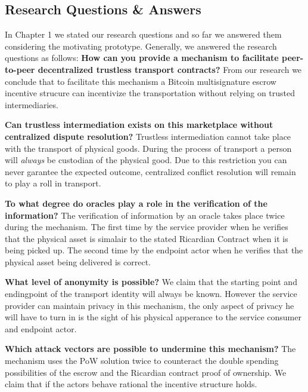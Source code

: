\subsection{Research Questions \& Answers}

In Chapter 1 we stated our research questions and so far we answered them considering the motivating prototype. Generally, we answered the research questions as follows:
\bigbreak
\noindent \textbf{How can you provide a mechanism to facilitate peer-to-peer decentralized trustless transport contracts?} From our research we conclude that to facilitate this mechanism a Bitcoin multisignature escrow incentive strucure can incentivize the transportation without relying on trusted intermediaries.

\bigbreak
\noindent \textbf{Can trustless intermediation exists on this marketplace without centralized dispute resolution?} Trustless intermediation cannot take place with the transport of physical goods. During the process of transport a person will \textit{always} be custodian of the physical good. Due to this restriction you can never garantee the expected outcome, centralized conflict resolution will remain to play a roll in transport.


\bigbreak
\noindent \textbf{To what degree do oracles play a role in the verification of the information?} The verification of information by an oracle takes place twice during the mechanism. The first time by the service provider when he verifies that the physical asset is simalair to the stated Ricardian Contract when it is being picked up. The second time by the endpoint actor when he verifies that the physical asset being delivered is correct.

\bigbreak
\noindent \textbf{What level of anonymity is possible?} We claim that the starting point and endingpoint of the transport identity will always be known. However the service provider can maintain privacy in this mechanism, the only aspect of privacy he will have to turn in is the sight of his physical apperance to the service consumer and endpoint actor.

\bigbreak
\noindent \textbf{Which attack vectors are possible to undermine this mechanism?} The mechanism uses the PoW solution twice to counteract the double spending possibilities of the escrow and the Ricardian contract proof of ownership. We claim that if the actors behave rational the incentive structure holds.
\newpage

